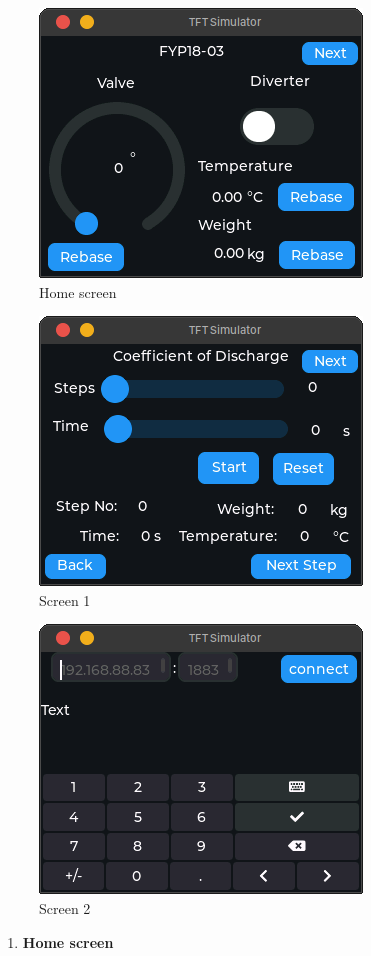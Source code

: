 \begin{itemize}
     \begin{figure}[H]
         \centering
         \includegraphics[width=.48\textwidth, height=.32\textheight]{Figures/home_screen.png}
         \caption{Home screen}
         \label{fig:home_screen}
     \end{figure}
     \begin{figure}[H]
         \centering
         \includegraphics[width=.48\textwidth, height=.32\textheight]{Figures/screen1.png}
         \caption{Screen 1}
         \label{fig:screen_1}
     \end{figure}
     \begin{figure}[H]
         \centering
         \includegraphics[width=.48\textwidth, height=.32\textheight]{Figures/screen2.png}
         \caption{Screen 2}
         \label{fig:screen_2}
     \end{figure}
     \begin{enumerate}
         \item \textbf{Home screen}\\

\end{enumerate}
\end{itemize}
